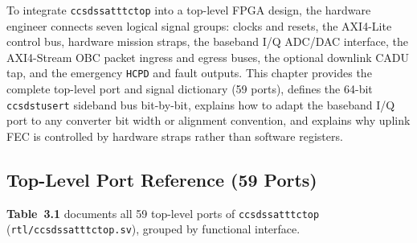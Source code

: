 \documentclass[10pt,a4paper]{article}
\renewcommand{\_}{\origunderscore\penalty0\hskip0pt\relax}
\numberwithin{table}{section}
\numberwithin{figure}{section}
\numberwithin{equation}{section}
\begin{document}
To integrate \texttt{ccsds\_sat\_ttc\_top} into a top-level FPGA design, the hardware engineer connects seven logical signal groups: clocks and resets, the AXI4-Lite control bus, hardware mission straps, the baseband I/Q ADC/DAC interface, the AXI4-Stream OBC packet ingress and egress buses, the optional downlink CADU tap, and the emergency \texttt{HCPD} and fault outputs. This chapter provides the complete top-level port and signal dictionary (59 ports), defines the 64-bit \texttt{ccsds\_tuser\_t} sideband bus bit-by-bit, explains how to adapt the baseband I/Q port to any converter bit width or alignment convention, and explains why uplink FEC is controlled by hardware straps rather than software registers.

\subsection{Top-Level Port Reference (59 Ports)}
\textbf{Table~3.1} documents all 59 top-level ports of \texttt{ccsds\_sat\_ttc\_top} (\texttt{rtl/ccsds\_sat\_ttc\_top.sv}), grouped by functional interface.
\end{document}
